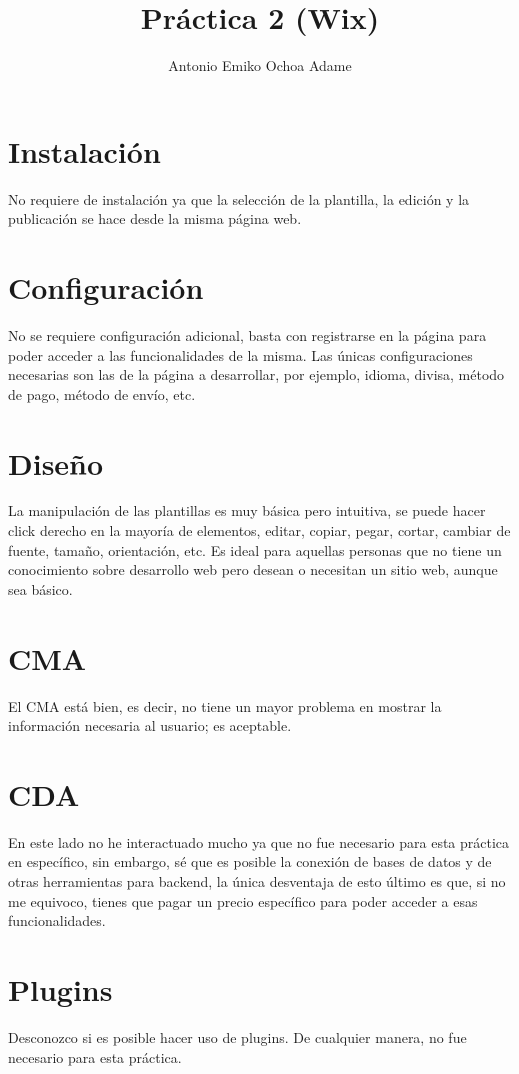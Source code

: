 \documentclass{article}
\begin{document}
\title{Práctica 2 (Wix)}
\author{Antonio Emiko Ochoa Adame}
\maketitle

\section{Instalación}
No requiere de instalación ya que la selección de la plantilla,
la edición y la publicación se hace desde la misma página web.

\section{Configuración}
No se requiere configuración adicional, basta con registrarse en la
página para poder acceder a las funcionalidades de la misma.
Las únicas configuraciones necesarias son las de la página a
desarrollar, por ejemplo, idioma, divisa, método de pago, método de
envío, etc.

\section{Diseño}
La manipulación de las plantillas es muy básica pero intuitiva, se
puede hacer click derecho en la mayoría de elementos, editar, copiar,
pegar, cortar, cambiar de fuente, tamaño, orientación, etc.
Es ideal para aquellas personas que no tiene un conocimiento sobre
desarrollo web pero desean o necesitan un sitio web, aunque sea
básico.

\section{CMA}
El CMA está bien, es decir, no tiene un mayor problema en mostrar
la información necesaria al usuario; es aceptable.

\section{CDA}
En este lado no he interactuado mucho ya que no fue necesario para
esta práctica en específico, sin embargo, sé que es posible la
conexión de bases de datos y de otras herramientas para backend, la única desventaja de esto último es que, si no me equivoco, tienes
que pagar un precio específico para poder acceder a esas funcionalidades.

\section{Plugins}
Desconozco si es posible hacer uso de plugins. De cualquier manera, no
fue necesario para esta práctica.
\end{document}
